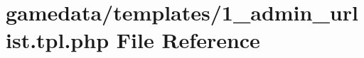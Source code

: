\hypertarget{1__admin__urlist_8tpl_8php}{\section{gamedata/templates/1\+\_\+admin\+\_\+urlist.tpl.\+php File Reference}
\label{1__admin__urlist_8tpl_8php}
}
